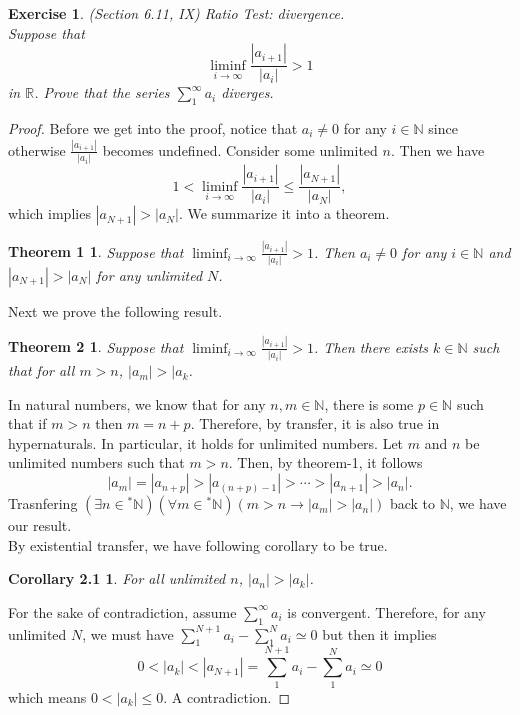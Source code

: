 \documentclass[a4paper, 11pt, openany]{book}
\theoremstyle{plain}
\newtheorem{exercise}{Exercise}[chapter]
\newtheorem*{theorem1}{Theorem 1}
\newtheorem*{theorem2}{Theorem 2}
\newtheorem*{corollary2.1}{Corollary 2.1}
\theoremstyle{plain}
\newcommand{\arr}{\rightarrow}
\newcommand{\N}{\mathbb{N}}
\newcommand{\R}{\mathbb{R}}
\newcommand{\hyp}{{}^*}
\begin{document}
  \begin{exercise}
    (Section 6.11, IX) Ratio Test: divergence. \\
    Suppose that $$\liminf_{i \arr \infty} \frac{|a_{i+1}|}{|a_i|}>1$$
    in $\R$. Prove that the series $\sum_{1}^\infty a_i$ diverges.
  \end{exercise}
  \begin{proof}
    Before we get into the proof, notice that $a_i \not = 0$ for any $i \in \N$ since otherwise $\frac{|a_{i+1}|}{|a_i|}$ becomes undefined. Consider some unlimited $n$. Then we have $$1<\liminf_{i \arr \infty} \frac{|a_{i+1}|}{|a_i|} \leq \frac{|a_{N+1}|}{|a_N|}, $$ 
    which implies $|a_{N+1}|>|a_N|$. We summarize it into a theorem. 
    \begin{theorem1}
      Suppose that $\liminf_{i \arr \infty} \frac{|a_{i+1}|}{|a_i|}>1$. Then $a_i \not =0$ for any $i \in \N$ and $|a_{N+1}|>|a_N|$ for any unlimited $N$. 
    \end{theorem1}
    Next we prove the following result. 
    \begin{theorem2}
      Suppose that $\liminf_{i \arr \infty} \frac{|a_{i+1}|}{|a_i|}>1$. Then there exists $k \in \N$ such that for all $m>n$, $|a_m|>|a_k$.
    \end{theorem2}
     In natural numbers, we know that for any $n,m \in \N$, there is some $p \in \N$ such that if $m>n$ then $m=n+p$. Therefore, by transfer, it is also true in hypernaturals. In particular, it holds for unlimited numbers. Let $m$ and $n$ be unlimited numbers such that $m>n$. Then, by theorem-1, it follows $$|a_m|=|a_{n+p}|>|a_{(n+p)-1}|>\cdots >|a_{n+1}|>|a_n|.$$
    Trasnfering $(\exists n \in \hyp \N)(\forall m \in \hyp \N)(m>n \arr |a_m|>|a_n|)$ back to $\N$, we have our result. \\

    By existential transfer, we have following corollary to be true. 
    \begin{corollary2.1}
      For all unlimited $n$, $|a_n|>|a_k|$.
    \end{corollary2.1}

    For the sake of contradiction, assume $\sum_{1}^\infty a_i$ is convergent. Therefore, for any unlimited $N$, we must have $\sum_{1}^{N+1} a_i - \sum_{1}^{N} a_i \simeq 0$ but then it implies $$0<|a_k|<|a_{N+1}|=\sum_{1}^{N+1} a_i - \sum_{1}^{N} a_i \simeq 0$$
    which means $0<|a_k| \leq 0$. A contradiction.
  \end{proof}
\end{document}
